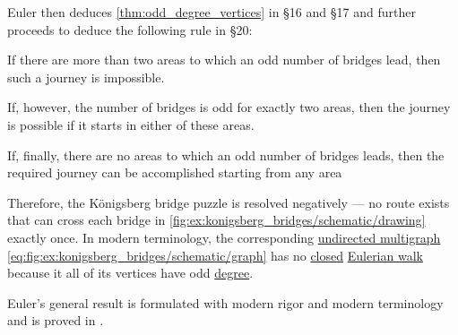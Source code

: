 \begin{example}
  Euler then deduces \cref{thm:odd_degree_vertices} in \S 16 and \S 17 and further proceeds to deduce the following rule in \S 20:
  \begin{displayquote}
    If there are more than two areas to which an odd number of bridges lead, then such a journey is impossible.

    If, however, the number of bridges is odd for exactly two areas, then the journey is possible if it starts in either of these areas.

    If, finally, there are no areas to which an odd number of bridges leads, then the required journey can be accomplished starting from any area
  \end{displayquote}

  Therefore, the K\"onigsberg bridge puzzle is resolved negatively --- no route exists that can cross each bridge in \cref{fig:ex:konigsberg_bridges/schematic/drawing} exactly once. In modern terminology, the corresponding \hyperref[def:hypergraph/multigraph]{undirected multigraph} \eqref{eq:fig:ex:konigsberg_bridges/schematic/graph} has no \hyperref[def:graph_walk/closed]{closed} \hyperref[def:eulerian_walk]{Eulerian walk} because it all of its vertices have odd \hyperref[def:graph_cardinality/undirected_degree]{degree}.

  Euler's general result is formulated with modern rigor and modern terminology and is proved in .
\end{example}
